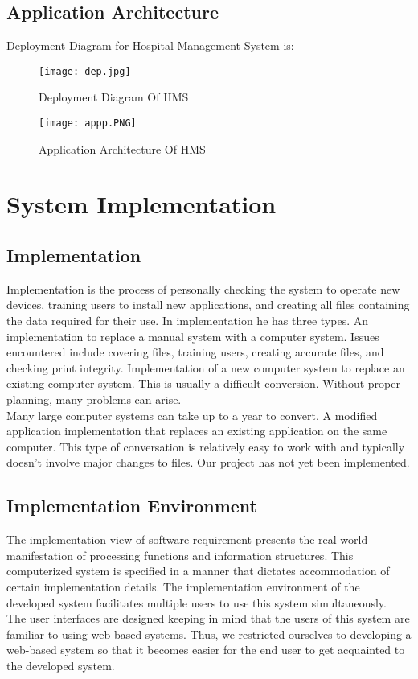 \documentclass{article}
\begin{document}
\subsection{Application Architecture}
Deployment Diagram for Hospital Management System is:
\begin{figure}[htp]
    \centering
    \texttt{[image: dep.jpg]}
    \caption{Deployment Diagram Of HMS }
    \label{fig:Deployment Diagram Of HMS  }
\end{figure}
\begin{figure}[htp]
    \centering
    \texttt{[image: appp.PNG]}
    \caption{Application Architecture Of HMS }
    \label{fig:Application Architecture Of HMS  }
\end{figure}
\section{System Implementation}
\subsection{Implementation}
Implementation is the process of personally checking the system to operate new devices, training users to install new applications, and creating all files containing the data required for their use. In implementation he has three types. An implementation to replace a manual system with a computer system. Issues encountered include covering files, training users, creating accurate files, and checking print integrity. Implementation of a new computer system to replace an existing computer system. This is usually a difficult conversion. Without proper planning, many problems can arise.\\ Many large computer systems can take up to a year to convert. A modified application implementation that replaces an existing application on the same computer. This type of conversation is relatively easy to work with and typically doesn't involve major changes to files. Our project has not yet been implemented.

\subsection{Implementation Environment}
The implementation view of software requirement presents the real world manifestation of processing functions and information structures. This computerized system is specified in a manner that dictates accommodation of certain implementation details. 
The implementation environment of the developed system facilitates multiple users to use this system simultaneously.\\ The user interfaces are designed keeping in mind that the users of this system are familiar to using web-based systems. Thus, we restricted ourselves to developing a web-based system so that it becomes easier for the end user to get acquainted to the developed system.
\end{document}
